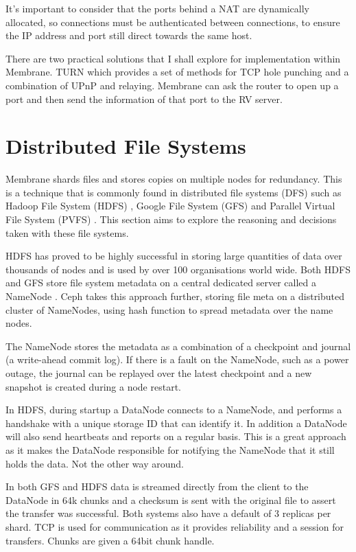\documentclass[11pt, a4paper, twoside]{report}
\begin{document}
It's important to consider that the ports behind a NAT are dynamically allocated, so connections must be authenticated between connections, to ensure the IP address and port still direct towards the same host.

There are two practical solutions that I shall explore for implementation within Membrane. TURN \citep{wing2010traversal} which provides a set of methods for TCP hole punching and a combination of UPnP and relaying. Membrane can ask the router to open up a port and then send the information of that port to the RV server.

\section{Distributed File Systems}

Membrane shards files and stores copies on multiple nodes for redundancy. This is a technique that is commonly found in distributed file systems (DFS) such as Hadoop File System (HDFS) \citep{hdfsAnalysis}, Google File System (GFS) \citep{TheGFS} and Parallel Virtual File System (PVFS) \citep{ross2000pvfs}. This section aims to explore the reasoning and decisions taken with these file systems.

HDFS has proved to be highly successful in storing large quantities of data over thousands of nodes and is used by over 100 organisations world wide. Both HDFS and GFS \citep{mckusick2010gfs} store file system metadata on a central dedicated server called a NameNode \citep{hdfsAnalysis}. Ceph takes this approach further, storing file meta on a distributed cluster of NameNodes, using hash function to spread metadata over the name nodes. \citep{weil2006ceph}

The NameNode stores the metadata as a combination of a checkpoint and journal (a write-ahead commit log). If there is a fault on the NameNode, such as a power outage, the journal can be replayed over the latest checkpoint and a new snapshot is created during a node restart.

In HDFS, during startup a DataNode connects to a NameNode, and performs a handshake with a unique storage ID that can identify it. In addition a DataNode will also send heartbeats and reports on a regular basis. \cite{hdfsAnalysis} This is a great approach as it makes the DataNode responsible for notifying the NameNode that it still holds the data. Not the other way around. 

In both GFS and HDFS data is streamed directly from the client to the DataNode in 64k chunks and a checksum is sent with the original file to assert the transfer was successful. Both systems also have a default of 3 replicas per shard. TCP is used for communication as it provides reliability and a session for transfers. Chunks are given a 64bit chunk handle.
\end{document}
